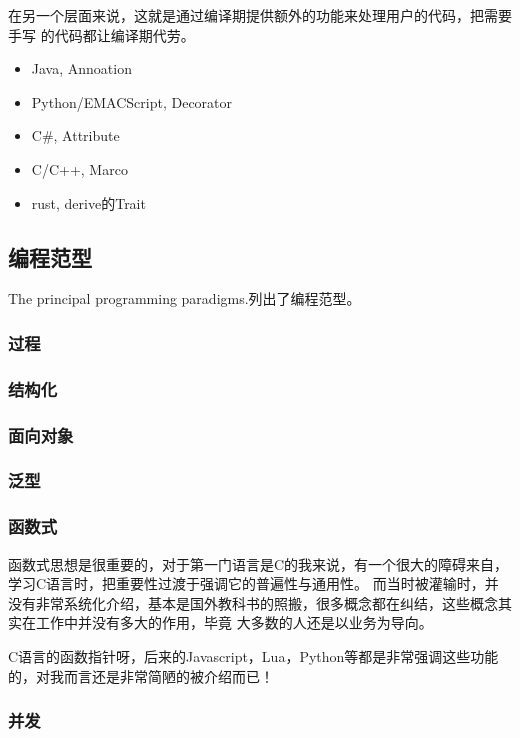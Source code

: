 在另一个层面来说，这就是通过编译期提供额外的功能来处理用户的代码，把需要手写
的代码都让编译期代劳。
\begin{itemize}
    \item {Java, Annoation}
    \item {Python/EMACScript, Decorator}
    \item {C\#, Attribute}
    \item {C/C++, Marco}
    \item {rust, derive的Trait}
\end{itemize}


\subsection{编程范型}
The principal programming paradigms.\cite{TPPP}列出了编程范型。

\subsubsection{过程}

\subsubsection{结构化}

\subsubsection{面向对象}

\subsubsection{泛型}

\subsubsection{函数式}

函数式思想是很重要的，对于第一门语言是C的我来说，有一个很大的障碍来自，学习C语言时，把重要性过渡于强调它的普遍性与通用性。
而当时被灌输时，并没有非常系统化介绍，基本是国外教科书的照搬，很多概念都在纠结，这些概念其实在工作中并没有多大的作用，毕竟
大多数的人还是以业务为导向。

C语言的函数指针呀，后来的Javascript，Lua，Python等都是非常强调这些功能的，对我而言还是非常简陋的被介绍而已！

\subsubsection{并发}

